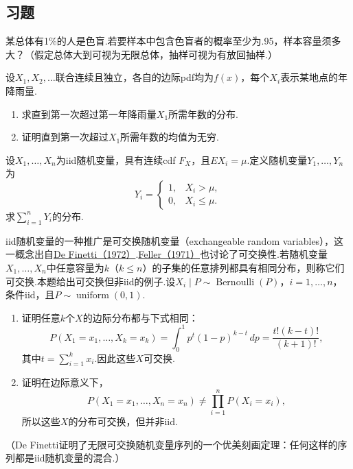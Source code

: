 \subsection{习题}\label{sec:5.7}
\begin{exercise}\label{exercise:5.1}
某总体有1\%的人是色盲.若要样本中包含色盲者的概率至少为.95，样本容量须多大？（假定总体大到可视为无限总体，抽样可视为有放回抽样.）
\end{exercise}
\begin{exercise}\label{exercise:5.2}
设$X_1,X_2,\ldots$联合连续且独立，各自的边际pdf均为$f(x)$，每个$X_i$表示某地点的年降雨量.
\begin{enumerate}[label=(\alph*)]
\item 求直到第一次超过第一年降雨量$X_1$所需年数的分布.
\item 证明直到第一次超过$X_1$所需年数的均值为无穷.
\end{enumerate}
\end{exercise}
\begin{exercise}\label{exercise:5.3}
设$X_1,\ldots,X_n$为iid随机变量，具有连续cdf $F_X$，且$EX_i=\mu$.定义随机变量$Y_1,\ldots,Y_n$为
$$Y_i=\begin{cases}1,&X_i>\mu,\\0,&X_i\le\mu.\end{cases}$$
求$\sum_{i=1}^nY_i$的分布.
\end{exercise}
\begin{exercise}\label{exercise:5.4}
iid随机变量的一种推广是可交换随机变量（exchangeable random variables），这一概念出自\hyperref[bib:source95]{De Finetti（1972）}.\hyperref[bib:source119]{Feller（1971）}也讨论了可交换性.若随机变量$X_1,\ldots,X_n$中任意容量为$k$（$k\le n$）的子集的任意排列都具有相同分布，则称它们可交换.本题给出可交换但非iid的例子.设$X_i\mid P\sim\operatorname{Bernoulli}(P)$，$i=1,\ldots,n$，条件iid，且$P\sim\operatorname{uniform}(0,1)$.
\begin{enumerate}[label=(\alph*)]
\item 证明任意$k$个$X$的边际分布都与下式相同：
$$P(X_1=x_1,\ldots,X_k=x_k)=\int_0^1p^t(1-p)^{k-t}\,dp=\frac{t!(k-t)!}{(k+1)!},$$
其中$t=\sum_{i=1}^kx_i$.因此这些$X$可交换.
\item 证明在边际意义下，
$$P(X_1=x_1,\ldots,X_n=x_n)\ne\prod_{i=1}^nP(X_i=x_i),$$
所以这些$X$的分布可交换，但并非iid.
\end{enumerate}
（De Finetti证明了无限可交换随机变量序列的一个优美刻画定理：任何这样的序列都是iid随机变量的混合.）
\end{exercise}
